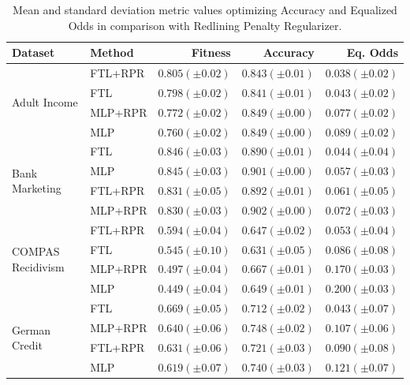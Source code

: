  \begin{table}
    \centering
    \caption{Mean and standard deviation metric values optimizing Accuracy and Equalized Odds in comparison with Redlining Penalty Regularizer.}\label{tab:complete_acc_odds_rpr}
    {\footnotesize \begin{tabular}{llrrr}
    \toprule
    Dataset & Method & Fitness & Accuracy & Eq. Odds \\
    \midrule
    
    \multirow[t]{4}{*}{Adult Income} & FTL+RPR & $0.805 (\pm0.02)$ & $0.843 (\pm0.01)$ & $0.038 (\pm0.02)$ \\
     & FTL & $0.798 (\pm0.02)$ & $0.841 (\pm0.01)$ & $0.043 (\pm0.02)$ \\
     & MLP+RPR & $0.772 (\pm0.02)$ & $0.849 (\pm0.00)$ & $0.077 (\pm0.02)$ \\
     & MLP & $0.760 (\pm0.02)$ & $0.849 (\pm0.00)$ & $0.089 (\pm0.02)$ \\
    \midrule
    \multirow[t]{4}{*}{Bank Marketing} & FTL & $0.846 (\pm0.03)$ & $0.890 (\pm0.01)$ & $0.044 (\pm0.04)$ \\
     & MLP & $0.845 (\pm0.03)$ & $0.901 (\pm0.00)$ & $0.057 (\pm0.03)$ \\
     & FTL+RPR & $0.831 (\pm0.05)$ & $0.892 (\pm0.01)$ & $0.061 (\pm0.05)$ \\
     & MLP+RPR & $0.830 (\pm0.03)$ & $0.902 (\pm0.00)$ & $0.072 (\pm0.03)$ \\
    \midrule
    \multirow[t]{4}{*}{COMPAS Recidivism} & FTL+RPR & $0.594 (\pm0.04)$ & $0.647 (\pm0.02)$ & $0.053 (\pm0.04)$ \\
     & FTL & $0.545 (\pm0.10)$ & $0.631 (\pm0.05)$ & $0.086 (\pm0.08)$ \\
     & MLP+RPR & $0.497 (\pm0.04)$ & $0.667 (\pm0.01)$ & $0.170 (\pm0.03)$ \\
     & MLP & $0.449 (\pm0.04)$ & $0.649 (\pm0.01)$ & $0.200 (\pm0.03)$ \\
    \midrule
    \multirow[t]{4}{*}{German Credit} & FTL & $0.669 (\pm0.05)$ & $0.712 (\pm0.02)$ & $0.043 (\pm0.07)$ \\
     & MLP+RPR & $0.640 (\pm0.06)$ & $0.748 (\pm0.02)$ & $0.107 (\pm0.06)$ \\
     & FTL+RPR & $0.631 (\pm0.06)$ & $0.721 (\pm0.03)$ & $0.090 (\pm0.08)$ \\
     & MLP & $0.619 (\pm0.07)$ & $0.740 (\pm0.03)$ & $0.121 (\pm0.07)$ \\
     \bottomrule
\end{tabular}}
\end{table}